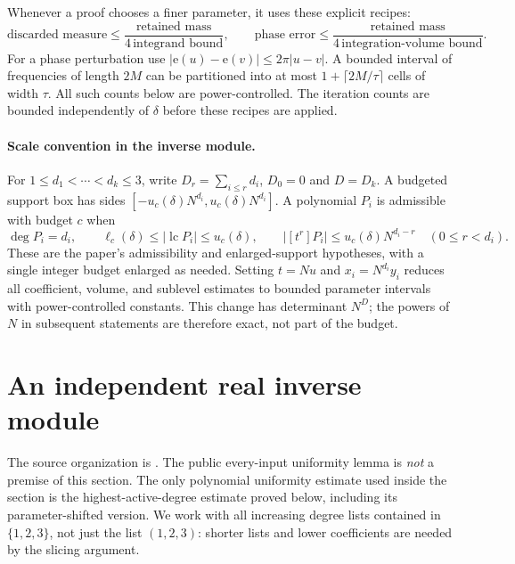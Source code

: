 \documentclass[11pt]{article}
\theoremstyle{definition}
\newcommand{\ee}[1]{\mathrm e\!\left(#1\right)}
\begin{document}
Whenever a proof chooses a finer parameter, it uses these explicit recipes:
\[
 \text{discarded measure}\leq\frac{\text{retained mass}}{4\,\text{integrand bound}},
 \qquad
 \text{phase error}\leq\frac{\text{retained mass}}{4\,\text{integration-volume bound}}.
\]
For a phase perturbation use $|\ee u-\ee v|\leq2\pi|u-v|$.
A bounded interval of frequencies of length $2M$ can be partitioned into at most
$1+\lceil2M/\tau\rceil$ cells of width $\tau$.  All such counts below are power-controlled.
The iteration counts are bounded independently of $\delta$ before these recipes are applied.

\paragraph{Scale convention in the inverse module.}
For $1\leq d_1<\cdots<d_k\leq3$, write $D_r=\sum_{i\leq r}d_i$, $D_0=0$ and $D=D_k$.
A budgeted support box has sides $[-u_c(\delta)N^{d_i},u_c(\delta)N^{d_i}]$.
A polynomial $P_i$ is admissible with budget $c$ when
\[
 \deg P_i=d_i,\qquad
 \ell_c(\delta)\leq|\operatorname{lc}P_i|\leq u_c(\delta),\qquad
 |[t^r]P_i|\leq u_c(\delta)N^{d_i-r}\quad(0\leq r<d_i).
\]
These are the paper's admissibility and enlarged-support hypotheses, with a single integer
budget enlarged as needed.  Setting $t=Nu$ and $x_i=N^{d_i}y_i$ reduces all coefficient,
volume, and sublevel estimates to bounded parameter intervals with power-controlled
constants.  This change has determinant $N^D$; the powers of $N$ in subsequent statements
are therefore exact, not part of the budget.


\section{An independent real inverse module}\label{sec:internal-kosz-adjoint}
The source organization is \cite[\S\S4.2--4.5]{KoszEtAl}.  The public every-input uniformity
lemma is \emph{not} a premise of this section.  The only polynomial uniformity estimate used
inside the section is the highest-active-degree estimate proved below, including its
parameter-shifted version.  We work with all increasing degree lists contained in $\{1,2,3\}$,
not just the list $(1,2,3)$: shorter lists and lower coefficients are needed by the slicing argument.
\end{document}
